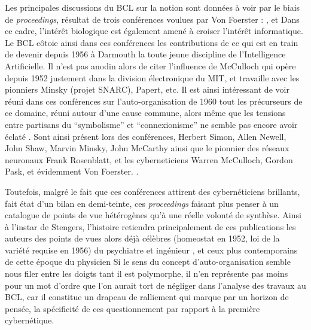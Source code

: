 Les principales discussions du BCL sur la notion sont données à voir par le biais de \textit{proceedings}, résultat de trois conférences voulues par Von Foerster : \autocite{Yovits1960}, \autocite{Yovits1962} et \autocite{Foerster1962} Dans ce cadre, l'intérêt biologique est également amené à croiser l'intérêt informatique. Le BCL côtoie ainsi dans ces conférences les contributions de ce qui est en train de devenir depuis 1956 à Darmouth la toute jeune discipline de l'Intelligence Artificielle. Il n'est pas anodin alors de citer l'influence de McCulloch qui opère depuis 1952 justement dans la division électronique du MIT, et travaille avec les pionniers Minsky (projet SNARC), Papert, etc. Il est ainsi intéressant de voir réuni dans ces conférences sur l'auto-organisation de 1960 tout les précurseurs de ce domaine, réuni autour d'une cause commune, alors même que les tensions entre partisans du \enquote{symbolisme} et \enquote {connexionisme} ne semble pas encore avoir éclaté . Sont ainsi présent lors des conférences, Herbert Simon, Allen Newell, John Shaw, Marvin Minsky, John McCarthy ainsi que le pionnier des réseaux neuronaux Frank Rosenblatt, et les cyberneticiens Warren McCulloch, Gordon Pask, et évidemment Von Foerster. \autocites[256]{Asaro2007}{Yovits1960}.

Toutefois, malgré le fait que ces conférences attirent des cybernéticiens brillants, \textcite[87]{Stengers1985} fait état d'un bilan en demi-teinte, ces \textit{proceedings} faisant plus penser à un catalogue de points de vue hétérogènes qu'à une réelle volonté de synthèse. Ainsi à l'instar de Stengers, l'histoire retiendra principalement de ces publications les auteurs des points de vues alors déjà célèbres (homeostat en 1952, loi de la variété requise en 1956) du psychiatre et ingénieur \autocites{Ashby1947, Ashby1962}, et ceux plus contemporains de cette époque du physicien \textcite{Foerster1959} \autocites{Muller2007a}[55-56]{Stengers1985} Si le sens du concept d'auto-organisation semble nous filer entre les doigts tant il est polymorphe, il n'en représente pas moins pour \textcite[106-110]{Livet1985} un mot d'ordre que l'on aurait tort de négliger dans l'analyse des travaux au BCL, car il constitue un drapeau de ralliement qui marque par un horizon de pensée, la spécificité de ces questionnement par rapport à la première cybernétique. 

